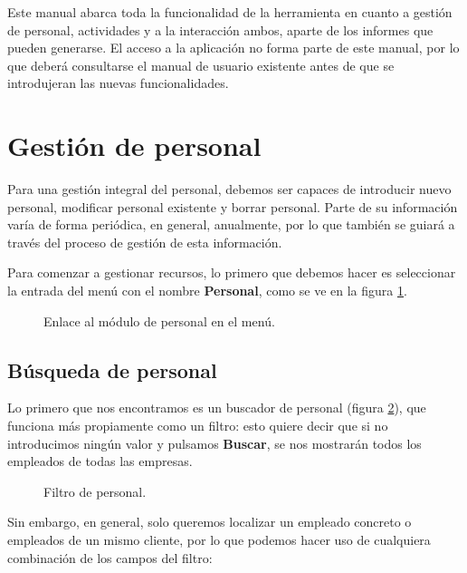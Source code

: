 
Este manual abarca toda la funcionalidad de la herramienta en cuanto a gestión
de personal, actividades y a la interacción ambos, aparte de los informes que
pueden generarse. El acceso a la aplicación no forma parte de este manual, por
lo que deberá consultarse el manual de usuario existente antes de que se
introdujeran las nuevas funcionalidades.

\section{Gestión de personal}
\label{sec:manual_personal}

Para una gestión integral del personal, debemos ser capaces de introducir nuevo
personal, modificar personal existente y borrar personal. Parte de su
información varía de forma periódica, en general, anualmente, por lo que
también se guiará a través del proceso de gestión de esta información.

Para comenzar a gestionar recursos, lo primero que debemos hacer es seleccionar
la entrada del menú con el nombre \textbf{Personal}, como se ve en la figura
\ref{fig:inicio_manual}.

\begin{figure}
\centering
{}
\caption{Enlace al módulo de personal en el menú.}
\label{fig:inicio_manual}
\end{figure}

\subsection{Búsqueda de personal}
\label{sec:manual_busqueda_personal}

Lo primero que nos encontramos es un buscador de personal (figura
\ref{fig:filtro_personal}), que funciona más propiamente como un filtro: esto
quiere decir que si no introducimos ningún valor y pulsamos \textbf{Buscar}, se
nos mostrarán todos los empleados de todas las empresas.

\begin{figure}
\centering
{}
\caption{Filtro de personal.}
\label{fig:filtro_personal}
\end{figure}

Sin embargo, en general, solo queremos localizar un empleado concreto o
empleados de un mismo cliente, por lo que podemos hacer uso de cualquiera
combinación de los campos del filtro:

